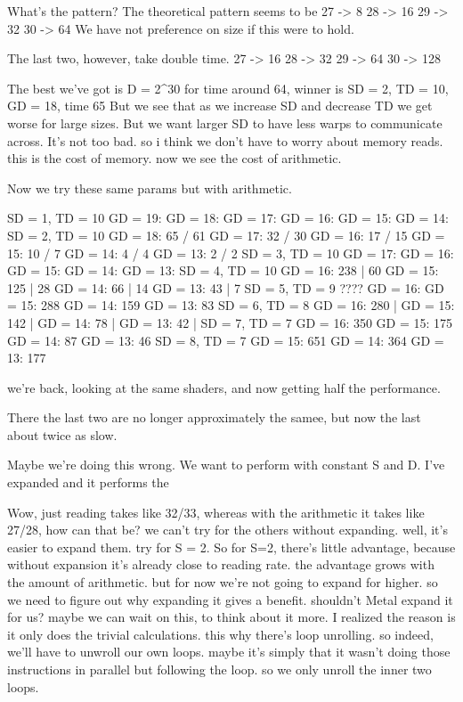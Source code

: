 What's the pattern?
The theoretical pattern seems to be
27 -> 8
28 -> 16
29 -> 32
30 -> 64
We have not preference on size if this were to hold.

The last two, however, take double time.
27 -> 16
28 -> 32
29 -> 64
30 -> 128

The best we've got is D = 2^30 for time around 64, winner is SD = 2, TD = 10, GD = 18, time 65
But we see that as we increase SD and decrease TD we get worse for large sizes.
But we want larger SD to have less warps to communicate across. 
It's not too bad. so i think we don't have to worry about memory reads. this is the cost of memory. now we see the cost of arithmetic. 

Now we try these same params but with arithmetic.

SD = 1, TD = 10
    GD = 19: 
    GD = 18: 
    GD = 17: 
    GD = 16: 
    GD = 15: 
    GD = 14: 
SD = 2, TD = 10
    GD = 18: 65 / 61
    GD = 17: 32 / 30
    GD = 16: 17 / 15
    GD = 15: 10 / 7
    GD = 14: 4 / 4
    GD = 13: 2 / 2
SD = 3, TD = 10
    GD = 17: 
    GD = 16: 
    GD = 15: 
    GD = 14: 
    GD = 13: 
SD = 4, TD = 10
    GD = 16: 238 | 60
    GD = 15: 125 | 28
    GD = 14: 66 | 14
    GD = 13: 43 | 7
SD = 5, TD = 9 ????
    GD = 16: 
    GD = 15: 288
    GD = 14: 159
    GD = 13: 83
SD = 6, TD = 8
    GD = 16: 280 |
    GD = 15: 142 | 
    GD = 14: 78 |
    GD = 13: 42 |
SD = 7, TD = 7
    GD = 16: 350
    GD = 15: 175
    GD = 14: 87
    GD = 13: 46
SD = 8, TD = 7
    GD = 15: 651
    GD = 14: 364
    GD = 13: 177

we're back, looking at the same shaders, and now getting half the performance.

There the last two are no longer approximately the samee, but now the last about twice as slow.

Maybe we're doing this wrong. 
We want to perform with constant S and D.
I've expanded and it performs the 

Wow, just reading takes like 32/33, whereas with the arithmetic it takes like 27/28, how can that be?
we can't try for the others without expanding. 
well, it's easier to expand them. try for S = 2.
So for S=2, there's little advantage, because without expansion it's already close to reading rate.
the advantage grows with the amount of arithmetic. 
but for now we're not going to expand for higher. 
so we need to figure out why expanding it gives a benefit. shouldn't Metal expand it for us?
maybe we can wait on this, to think about it more.
I realized the reason is it only does the trivial calculations. this why there's loop unrolling. so indeed, we'll have to unwroll our own loops. 
maybe it's simply that it wasn't doing those instructions in parallel but following the loop. so we only unroll the inner two loops.

